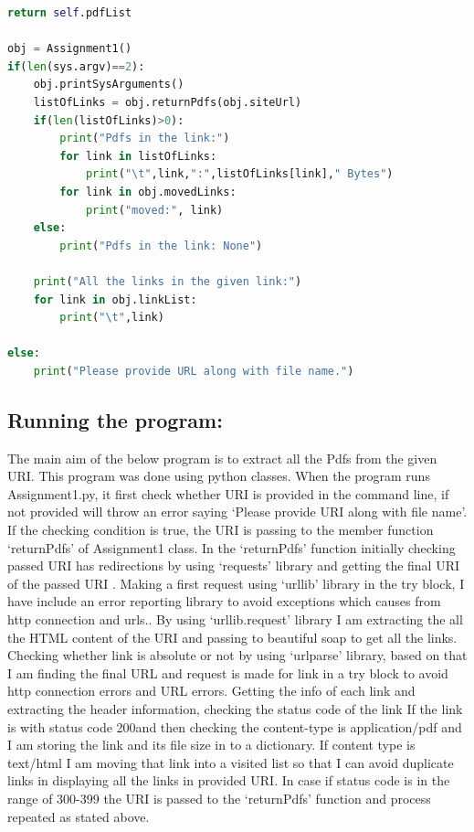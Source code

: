 \documentclass[a4paper, 11pt]{article}
\begin{document}
\begin{lstlisting}[language=python,label=Python-code,caption=The content of Assignment1.py]
		return self.pdfList

obj = Assignment1()
if(len(sys.argv)==2):
	obj.printSysArguments()
	listOfLinks = obj.returnPdfs(obj.siteUrl)
	if(len(listOfLinks)>0):
		print("Pdfs in the link:")
		for link in listOfLinks:
			print("\t",link,":",listOfLinks[link]," Bytes")
		for link in obj.movedLinks:
			print("moved:", link)
	else:
		print("Pdfs in the link: None")

	print("All the links in the given link:")
	for link in obj.linkList:
		print("\t",link)

else:
	print("Please provide URL along with file name.")
\end{lstlisting}
\subsection*{Running the program:}
The main aim of the below program is to extract all the Pdfs from the given URI. This program was done using python classes. When the program runs Assignment1.py, it first check whether URI is provided in the command line, if not provided will throw an error saying ‘Please provide URI along with file name’. If the checking condition is true, the URI is passing to the member function ‘returnPdfs’ of Assignment1 class. 
In the ‘returnPdfs’ function  initially checking passed URI has redirections by using ‘requests’ library and  getting the final URI  of the  passed URI . Making a first request using ‘urllib’ library in the try block, I have include an error reporting library to avoid exceptions which causes from http connection and urls.. By using ‘urllib.request’ library I am extracting the all the HTML content of the URI and passing to beautiful soap to get all the links. 
Checking whether link is absolute or not by using ‘urlparse’ library, based on that I am finding the final URL and  request is made for link in a try block to avoid http connection errors and URL errors. Getting the info of each link and extracting the header information, checking the status  code of the link If the link is with status code 200and then checking the  content-type is application/pdf  and  I am storing the link and its file size in to a dictionary. If content type is text/html I am moving that link into a visited list so that I can avoid duplicate links in displaying all the links in provided URI. In case if status code is in the range of 300-399 the URI is passed to the ‘returnPdfs’ function and process repeated as stated above. 
\end{document}
